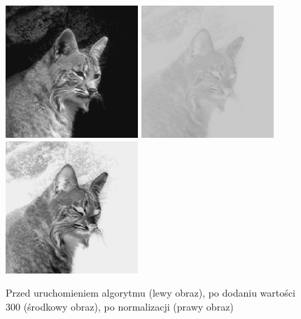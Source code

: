 \documentclass[a4paper,12pt]{book}
\begin{document}
\begin{figure}[H]
	\caption{Przed uruchomieniem algorytmu (lewy obraz), po dodaniu wartości 300 (środkowy obraz), po normalizacji (prawy obraz)}
	\includegraphics[width=5cm, height=5cm]{cat-unmodified.jpg}
	\includegraphics[width=5cm, height=5cm]{2/sum-gray-const-300.png}
	\includegraphics[width=5cm, height=5cm]{2/sum-gray-const-300-norm.png}
\end{figure}
\end{document}
